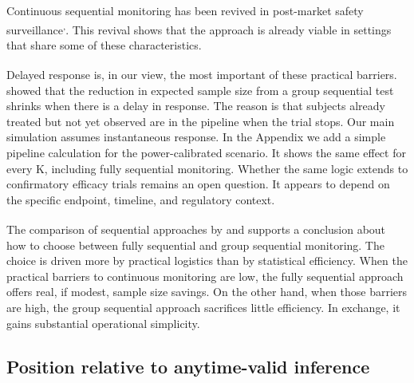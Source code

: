 \documentclass[
  11pt,
]{article}
\begin{document}
Continuous sequential monitoring has been revived in
post-market safety surveillance\textsuperscript{,}. This
revival shows that the approach is already viable in
settings that share some of these characteristics.

Delayed response is, in our view, the most important
of these practical barriers.\textsuperscript{} showed
that the reduction in expected sample size from a group
sequential test shrinks when there is a delay in
response. The reason is that subjects already treated
but not yet observed are in the pipeline when the trial
stops. Our main simulation assumes instantaneous
response. In the Appendix we add a simple pipeline
calculation for the power-calibrated scenario. It shows
the same effect for every K, including fully sequential
monitoring. Whether the same logic extends to
confirmatory efficacy trials remains an open question.
It appears to depend on the specific endpoint,
timeline, and regulatory context.

The comparison of sequential approaches by\textsuperscript{} and\textsuperscript{}
supports a conclusion about how to choose between fully
sequential and group sequential monitoring. The choice
is driven more by practical logistics than by
statistical efficiency. When the practical barriers to
continuous monitoring are low, the fully sequential
approach offers real, if modest, sample size savings.
On the other hand, when those barriers are high, the
group sequential approach sacrifices little efficiency.
In exchange, it gains substantial operational
simplicity.

\subsection{Position relative to anytime-valid inference}\label{position-relative-to-anytime-valid-inference}
\end{document}
